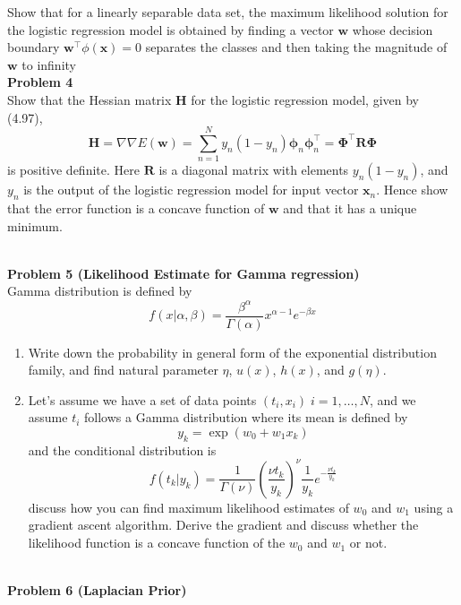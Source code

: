 \documentclass{article}
\begin{document}
Show  that  for  a  linearly  separable  data  set,  the  maximum  likelihood  solution  for  the  logistic 
regression model is obtained by finding a vector $\mathbf{w}$ whose decision boundary $\mathbf{w}^\top\phi(\mathbf{x}) = 0$ separates the 
classes and then taking the magnitude of $\mathbf{w}$ to infinity 
\color{black}
\leavevmode\\
\noindent
\Large{\textbf{Problem 4}}\normalsize
\\

Show  that  the  Hessian  matrix  $\mathbf{H}$  for  the  logistic  regression  model,  given  by  (4.97),  
\begin{equation}
    \mathbf{H} = \nabla\nabla E(\mathbf{w}) = \sum_{n=1}^N y_n(1-y_n)\mathbf{\phi}_n\mathbf{\phi}_n^\top = \mathbf{\Phi}^{\top} \mathbf{R}\mathbf{\Phi}
\end{equation}
is  positive definite.  Here  $\mathbf{R}$  is  a  diagonal  matrix  with  elements  $y_n(1-y_n)$,  and  $y_n$  is  the  output  of  the  logistic 
regression model for input vector  $\mathbf{x}_n$. Hence show that the error function is a concave function of $\mathbf{w}$ and 
that it has a unique minimum. 

\leavevmode\\

\noindent
\Large{\textbf{Problem 5 (Likelihood Estimate for Gamma regression)}}\normalsize
\\

Gamma distribution is defined by  
\begin{equation}
    f(x|\alpha, \beta) = \frac{\beta^\alpha}{\Gamma(\alpha)} x^{\alpha-1} e^{-\beta x}
\end{equation}
\begin{enumerate}
    \item Write down the probability in general form of the exponential distribution family, and find 
    natural parameter $\eta$, $u(x)$, $h(x)$, and $g(\eta)$.
    \item Let’s assume we have a set of data points $(t_i,x_i)\; i = 1, \dots, N$, and we assume $t_i$ follows a Gamma 
    distribution where its mean is defined by
    \begin{equation}
        y_k = \exp\left(w_0 + w_1 x_k\right)
    \end{equation}
    and the conditional distribution is 
    \begin{equation}
        f(t_k|y_k) =  \frac{1}{\Gamma(\nu)}\left(\frac{\nu t_k}{y_k}\right)^{\nu} \frac{1}{y_k} e^{-\frac{\nu t_k}{y_k}}
    \end{equation}
    discuss how you can find maximum likelihood estimates of $w_0$ and $w_1$ using a gradient ascent algorithm. Derive the gradient and discuss whether the likelihood function is a concave function of the $w_0$ and $w_1$ or not.
\end{enumerate}
\leavevmode\\
\noindent
\Large{\textbf{Problem 6 (Laplacian Prior)}}\normalsize
\\
\end{document}
